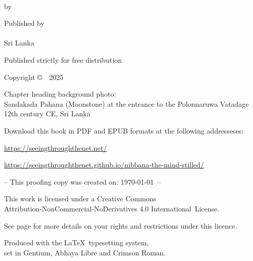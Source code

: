\cleartoverso
\thispagestyle{empty}

{\copyrightsize
\centering
\setlength{\parindent}{0pt}%
\setlength{\parskip}{0.8\baselineskip}%

\thetitle\\
\thesubtitle

\ifthenelse{\equal{}{\theVolumeTitle}}{}{\textbf{\theVolumeTitle}}{}

by \theauthor

Published by\\
\thePublisher\\
Sri Lanka

Published strictly for free distribution


Copyright \copyright\ \thePublisher\ 2025

Chapter heading background photo:\\
Sandakada Pahana (Moonstone) at the entrance to the Polonnaruwa Vatadage\\
12th century CE, Sri Lanka

Download this book in PDF and EPUB formats at the following addresseses:

\href{https://seeingthroughthenet.net/}{https://seeingthroughthenet.net/}

\href{https://seeingthroughthenet.github.io/nibbana-the-mind-stilled/}{https://seeingthroughthenet.github.io/nibbana-the-mind-stilled/}

\vfill

-- This proofing copy was created on: \today\ --

\vfill

{\footnotesize

This work is licensed under a Creative Commons\\
Attribution-NonCommercial-NoDerivatives 4.0 International~License.

See page \pageref{copyright-details} for more details on your rights and restrictions under this licence.

Produced with the \LaTeX\ typesetting system,\\ set in Gentium, Abhaya Libre and Crimson Roman.

\theEditionInfo

}}
